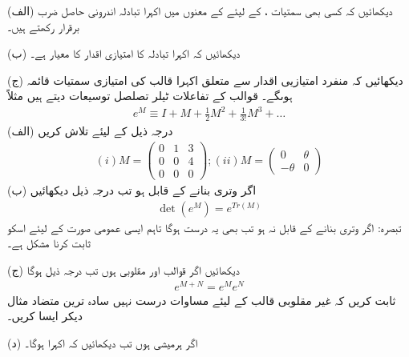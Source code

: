 (الف) دیکھائیں کہ کسی بھی سمتیات ،  کے لیئے  کے معنوں میں  اکہرا تبادلہ اندرونی حاصل ضرب برقرار رکھتے ہیں۔

(ب) دیکھائیں کہ اکہرا تبادلہ کا امتیازی اقدار کا معیار  ہے۔

(ج) دیکھائیں کہ منفرد امتیازیی اقدار سے متعلق اکہرا قالب کی امتیازی سمتیات قائمہ ہوںگے۔
قوالب کے تفاعلات ٹیلر تصلصل توسیعات دیتے ہیں مثلاً 
\begin{align}
	e^M\equiv I + M +\frac{1}{2}M^2 + \frac{1}{3!}M^3 + \dots
\end{align}
(الف) درجہ ذیل کے لیئے  تلاش کریں
\begin{align*}
	(i) M=
	\begin{pmatrix}
		0 & 1 & 3\\
		0 & 0 & 4\\
		0 & 0 & 0
	\end{pmatrix}
		; (ii) M=
	\begin{pmatrix}
		0 & \theta\\
		-\theta & 0
	\end{pmatrix}
\end{align*}
(ب) اگر  وتری بنانے کے قابل ہو تب درجہ ذیل دیکھائیں
\begin{align}
	\det\left(e^M\right) = e^{Tr(M)}
\end{align}
تبصرہ: اگر  وتری بنانے کے قابل نہ ہو تب بھی یہ درست ہوگا تاہم ایسی عمومی صورت کے لیئے اسکو ثابت کرنا مشکل ہے۔

(ج) دیکھائیں اگر قوالب  اور  مقلوبی ہوں تب درجہ ذیل ہوگا
\begin{align}
	e^{M+N} = e^Me^N
\end{align}
ثابت کریں کہ غیر مقلوبی قالب کے لیئے مساوات  درست نہیں سادہ ترین متضاد مثال دیکر ایسا کریں۔

(د) اگر  ہرمیشی ہوں تب دیکھائیں کہ اکہرا ہوگا۔
